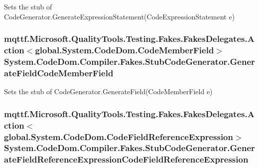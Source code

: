 Sets the stub of Code\-Generator.\-Generate\-Expression\-Statement(\-Code\-Expression\-Statement e)

\hypertarget{class_system_1_1_code_dom_1_1_compiler_1_1_fakes_1_1_stub_code_generator_a78a3ac374aa10b11df439f89769caa2c}{
\subsubsection[{Generate\-Field\-Code\-Member\-Field}]{\setlength{\rightskip}{0pt plus 5cm}mqttf.\-Microsoft.\-Quality\-Tools.\-Testing.\-Fakes.\-Fakes\-Delegates.\-Action$<$global.\-System.\-Code\-Dom.\-Code\-Member\-Field$>$ System.\-Code\-Dom.\-Compiler.\-Fakes.\-Stub\-Code\-Generator.\-Generate\-Field\-Code\-Member\-Field}}\label{class_system_1_1_code_dom_1_1_compiler_1_1_fakes_1_1_stub_code_generator_a78a3ac374aa10b11df439f89769caa2c}


Sets the stub of Code\-Generator.\-Generate\-Field(\-Code\-Member\-Field e)

\hypertarget{class_system_1_1_code_dom_1_1_compiler_1_1_fakes_1_1_stub_code_generator_afb163cd761d4bb003651c63eb133c14e}{
\subsubsection[{Generate\-Field\-Reference\-Expression\-Code\-Field\-Reference\-Expression}]{\setlength{\rightskip}{0pt plus 5cm}mqttf.\-Microsoft.\-Quality\-Tools.\-Testing.\-Fakes.\-Fakes\-Delegates.\-Action$<$global.\-System.\-Code\-Dom.\-Code\-Field\-Reference\-Expression$>$ System.\-Code\-Dom.\-Compiler.\-Fakes.\-Stub\-Code\-Generator.\-Generate\-Field\-Reference\-Expression\-Code\-Field\-Reference\-Expression}}\label{class_system_1_1_code_dom_1_1_compiler_1_1_fakes_1_1_stub_code_generator_afb163cd761d4bb003651c63eb133c14e}


